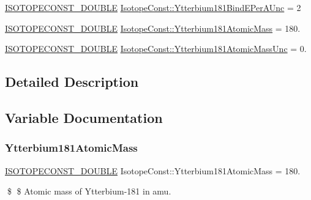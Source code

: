 \begin{DoxyCompactItemize}
\mbox{\hyperlink{group___isotope_const-_macros_ga8f45a7272ce02c0b4c65c44636ed719a}{I\+S\+O\+T\+O\+P\+E\+C\+O\+N\+S\+T\+\_\+\+D\+O\+U\+B\+LE}} \mbox{\hyperlink{group___isotope_const-_ytterbium-_yb181_gacc9eae2bae44fafe93ad9da90627091f}{Isotope\+Const\+::\+Ytterbium181\+Bind\+E\+Per\+A\+Unc}} = 2
\item 
\mbox{\hyperlink{group___isotope_const-_macros_ga8f45a7272ce02c0b4c65c44636ed719a}{I\+S\+O\+T\+O\+P\+E\+C\+O\+N\+S\+T\+\_\+\+D\+O\+U\+B\+LE}} \mbox{\hyperlink{group___isotope_const-_ytterbium-_yb181_gae4858039594e60293de272ce7fcfec56}{Isotope\+Const\+::\+Ytterbium181\+Atomic\+Mass}} = 180.
\item 
\mbox{\hyperlink{group___isotope_const-_macros_ga8f45a7272ce02c0b4c65c44636ed719a}{I\+S\+O\+T\+O\+P\+E\+C\+O\+N\+S\+T\+\_\+\+D\+O\+U\+B\+LE}} \mbox{\hyperlink{group___isotope_const-_ytterbium-_yb181_ga04fe147d1079c9f7cc1bc740ff7979fb}{Isotope\+Const\+::\+Ytterbium181\+Atomic\+Mass\+Unc}} = 0.
\end{DoxyCompactItemize}


\subsection{Detailed Description}


\subsection{Variable Documentation}
\mbox{\label{group___isotope_const-_ytterbium-_yb181_gae4858039594e60293de272ce7fcfec56}} 
\subsubsection{\texorpdfstring{Ytterbium181\+Atomic\+Mass}{Ytterbium181AtomicMass}}
{\footnotesize\ttfamily \mbox{\hyperlink{group___isotope_const-_macros_ga8f45a7272ce02c0b4c65c44636ed719a}{I\+S\+O\+T\+O\+P\+E\+C\+O\+N\+S\+T\+\_\+\+D\+O\+U\+B\+LE}} Isotope\+Const\+::\+Ytterbium181\+Atomic\+Mass = 180.}

\$ \$ Atomic mass of Ytterbium-\/181 in amu. \mbox{\label{group___isotope_const-_ytterbium-_yb181_ga04fe147d1079c9f7cc1bc740ff7979fb}} 
